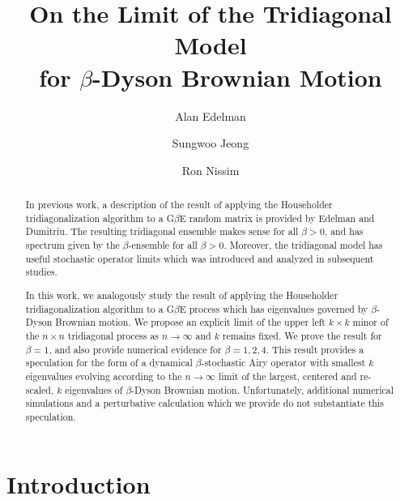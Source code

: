 \documentclass{amsart}
\title[Tridiagonal Model for $\beta$-Dyson Brownian Motion]{On the Limit of the Tridiagonal Model \\for $\beta$-Dyson Brownian Motion}
\author{Alan Edelman}
\author{Sungwoo Jeong}
\author{Ron Nissim}
\numberwithin{equation}{section}
\begin{document}
\begin{abstract} 
    In previous work, a description of the result of applying the Householder tridiagonalization algorithm to a G$\beta$E random matrix is provided by Edelman and Dumitriu. The resulting tridiagonal ensemble makes sense for all $\beta>0$, and has spectrum given by the $\beta$-ensemble for all $\beta>0$. Moreover, the tridiagonal model has useful stochastic operator limits which was introduced and analyzed in subsequent studies. 
    \par In this work, we analogously study the result of applying the Householder tridiagonalization algorithm to a G$\beta$E process which has eigenvalues governed by $\beta$-Dyson Brownian motion. We propose an explicit limit of the upper left $k \times k$ minor of the $n \times n$ tridiagonal process as $n \to \infty$ and $k$ remains fixed. We prove the result for $\beta=1$, and also provide numerical evidence for $\beta=1,2,4$. This result provides a speculation for the form of a dynamical $\beta$-stochastic Airy operator with smallest $k$ eigenvalues evolving according to the $n \to \infty$ limit of the largest, centered and re-scaled, $k$ eigenvalues of $\beta$-Dyson Brownian motion. Unfortunately, additional numerical simulations and a perturbative calculation which we provide do not substantiate this speculation.
\end{abstract}

\maketitle








\section{Introduction}
\end{document}
